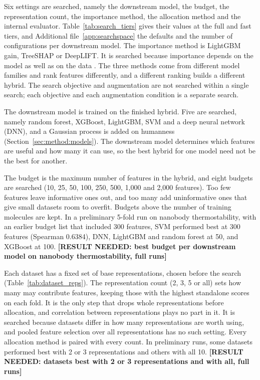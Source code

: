 Six settings are searched, namely the downstream model, the budget, the representation count, the importance method, the allocation method and the internal evaluator. Table~\ref{tab:search_tiers} gives their values at the full and fast tiers, and Additional file~\ref{app:searchspace} the defaults and the number of configurations per downstream model. The importance method is LightGBM gain, TreeSHAP or DeepLIFT. It is searched because importance depends on the model as well as on the data \citep{Dong2020}. The three methods come from different model families and rank features differently, and a different ranking builds a different hybrid. The search objective and augmentation are not searched within a single search; each objective and each augmentation condition is a separate search.

The downstream model is trained on the finished hybrid. Five are searched, namely random forest, XGBoost, LightGBM, SVM and a deep neural network (DNN), and a Gaussian process is added on humanness (Section~\ref{sec:method:models}). The downstream model determines which features are useful and how many it can use, so the best hybrid for one model need not be the best for another.

The budget is the maximum number of features in the hybrid, and eight budgets are searched (10, 25, 50, 100, 250, 500, 1,000 and 2,000 features). Too few features leave informative ones out, and too many add uninformative ones that give small datasets room to overfit. Budgets above the number of training molecules are kept. In a preliminary 5-fold run on nanobody thermostability, with an earlier budget list that included 300 features, SVM performed best at 300 features (Spearman 0.6384), DNN, LightGBM and random forest at 50, and XGBoost at 100. \textbf{[RESULT NEEDED: best budget per downstream model on nanobody thermostability, full runs]}

Each dataset has a fixed set of base representations, chosen before the search (Table~\ref{tab:dataset_reps}). The representation count (2, 3, 5 or all) sets how many may contribute features, keeping those with the highest standalone scores on each fold. It is the only step that drops whole representations before allocation, and correlation between representations plays no part in it. It is searched because datasets differ in how many representations are worth using, and pooled feature selection over all representations has no such setting. Every allocation method is paired with every count. In preliminary runs, some datasets performed best with 2 or 3 representations and others with all 10. \textbf{[RESULT NEEDED: datasets best with 2 or 3 representations and with all, full runs]}


